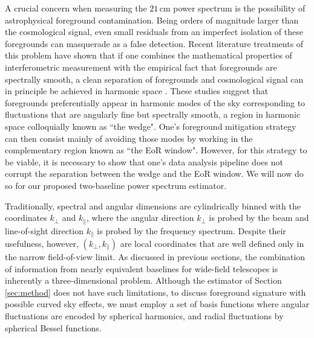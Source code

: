 \documentclass[twocolumn,apj,numberedappendix]{emulateapj}
\renewcommand\[{\begin{equation}}
\renewcommand\]{\end{equation}}
\begin{document}
A crucial concern when measuring the $21\,\textrm{cm}$ power spectrum is the possibility of astrophysical foreground contamination. Being orders of magnitude larger than the cosmological signal, even small residuals from an imperfect isolation of these foregrounds can masquerade as a false detection. Recent literature treatments of this problem have shown that if one combines the mathematical properties of interferometric measurement with the empirical fact that foregrounds are spectrally smooth, a clean separation of foregrounds and cosmological signal can in principle be achieved in harmonic space \citep{wedge1, wedge2}. These studies suggest that foregrounds preferentially appear in harmonic modes of the sky corresponding to fluctuations that are angularly fine but spectrally smooth, a region in harmonic space colloquially known as ``the wedge". One's foreground mitigation strategy can then consist mainly of avoiding those modes by working in the complementary region known as ``the EoR window". However, for this strategy to be viable, it is necessary to show that one's data analysis pipeline does not corrupt the separation between the wedge and the EoR window. We will now do so for our proposed two-baseline power spectrum estimator.


Traditionally, spectral and angular dimensions are cylindrically binned with the coordinates $k_\bot$ and  $k_\parallel$, where the angular direction $k_\bot$ is probed by the beam and line-of-sight direction $k_\parallel$ is probed by the frequency spectrum. Despite their usefulness, however, $(k_\bot, k_\parallel)$ are local coordinates that are well defined only in the narrow field-of-view limit. 
As discussed in previous sections, the combination of information from nearly equivalent baselines for wide-field telescopes is inherently a three-dimensional problem. Although the estimator of Section \ref{sec:method} does not have such limitations, to discuss foreground signature with possible curved sky effects, we must employ a set of basis functions where angular fluctuations are encoded by spherical harmonics, and radial fluctuations by spherical Bessel functions. 
\end{document}
